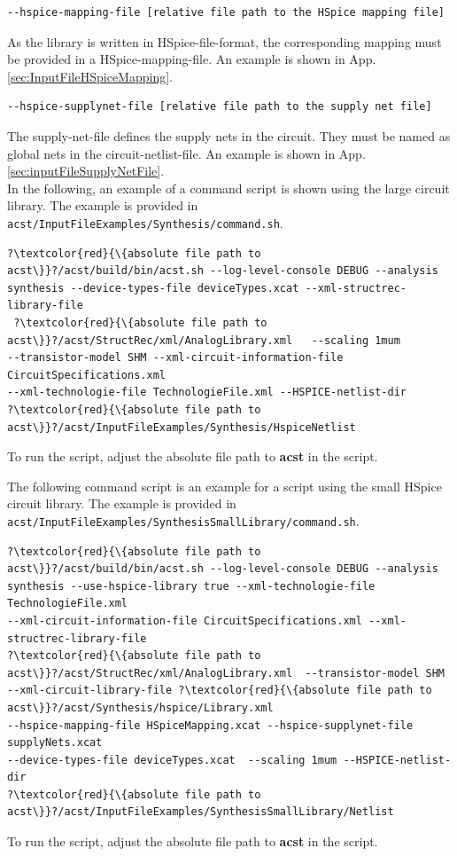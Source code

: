 \begin{lstlisting}[basicstyle=\ttfamily\scriptsize,backgroundcolor={\color{gray!30}}, escapechar=? ]
--hspice-mapping-file [relative file path to the HSpice mapping file]
\end{lstlisting}
As the library is written in HSpice-file-format, the corresponding mapping must be provided in a HSpice-mapping-file. An example is shown in App. \ref{sec:InputFileHSpiceMapping}.
\\

\begin{lstlisting}[basicstyle=\ttfamily\scriptsize,backgroundcolor={\color{gray!30}}, escapechar=? ]
--hspice-supplynet-file [relative file path to the supply net file]
\end{lstlisting}
The supply-net-file defines the supply nets in the circuit. They must be named as global nets in the circuit-netlist-file. An example is shown in App. \ref{sec:inputFileSupplyNetFile}.
\\

In the following, an example of a command script is shown using the large circuit library. The example is provided in {\tt acst/InputFileExamples/Synthesis/command.sh}.
\begin{lstlisting}[basicstyle=\ttfamily\scriptsize,backgroundcolor={\color{gray!30}}, escapechar=? ]
?\textcolor{red}{\{absolute file path to acst\}}?/acst/build/bin/acst.sh --log-level-console DEBUG --analysis 
synthesis --device-types-file deviceTypes.xcat --xml-structrec-library-file
 ?\textcolor{red}{\{absolute file path to acst\}}?/acst/StructRec/xml/AnalogLibrary.xml   --scaling 1mum
--transistor-model SHM --xml-circuit-information-file CircuitSpecifications.xml  
--xml-technologie-file TechnologieFile.xml --HSPICE-netlist-dir 
?\textcolor{red}{\{absolute file path to acst\}}?/acst/InputFileExamples/Synthesis/HspiceNetlist
\end{lstlisting}
To run the script, adjust the absolute file path to {\bf acst} in the script.

The following command script is an example for a script using the small HSpice circuit library. The example is provided in {\tt acst/InputFileExamples/SynthesisSmallLibrary/command.sh}.
\begin{lstlisting}[basicstyle=\ttfamily\scriptsize,backgroundcolor={\color{gray!30}}, escapechar=? ]
?\textcolor{red}{\{absolute file path to acst\}}?/acst/build/bin/acst.sh --log-level-console DEBUG --analysis
synthesis --use-hspice-library true --xml-technologie-file TechnologieFile.xml
--xml-circuit-information-file CircuitSpecifications.xml --xml-structrec-library-file 
?\textcolor{red}{\{absolute file path to acst\}}?/acst/StructRec/xml/AnalogLibrary.xml  --transistor-model SHM 
--xml-circuit-library-file ?\textcolor{red}{\{absolute file path to acst\}}?/acst/Synthesis/hspice/Library.xml 
--hspice-mapping-file HSpiceMapping.xcat --hspice-supplynet-file supplyNets.xcat 
--device-types-file deviceTypes.xcat  --scaling 1mum --HSPICE-netlist-dir
?\textcolor{red}{\{absolute file path to acst\}}?/acst/InputFileExamples/SynthesisSmallLibrary/Netlist 
\end{lstlisting}
To run the script, adjust the absolute file path to {\bf acst} in the script.


